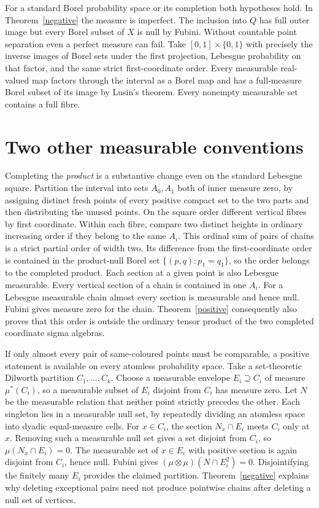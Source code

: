 \documentclass[11pt]{article}
\begin{document}
For a standard Borel probability space or its completion both hypotheses hold. In Theorem~\ref{negative} the measure is imperfect. The inclusion into $Q$ has full outer image but every Borel subset of $X$ is null by Fubini. Without countable point separation even a perfect measure can fail. Take $[0,1]\times\{0,1\}$ with precisely the inverse images of Borel sets under the first projection, Lebesgue probability on that factor, and the same strict first-coordinate order. Every measurable real-valued map factors through the interval as a Borel map and has a full-measure Borel subset of its image by Lusin's theorem. Every nonempty measurable set contains a full fibre.

\section{Two other measurable conventions}
Completing the \emph{product} is a substantive change even on the standard Lebesgue square. Partition the interval into sets $A_0,A_1$ both of inner measure zero, by assigning distinct fresh points of every positive compact set to the two parts and then distributing the unused points. On the square order different vertical fibres by first coordinate. Within each fibre, compare two distinct heights in ordinary increasing order if they belong to the same $A_i$. This ordinal sum of pairs of chains is a strict partial order of width two. Its difference from the first-coordinate order is contained in the product-null Borel set $\{(p,q):p_1=q_1\}$, so the order belongs to the completed product. Each section at a given point is also Lebesgue measurable. Every vertical section of a chain is contained in one $A_i$. For a Lebesgue measurable chain almost every section is measurable and hence null. Fubini gives measure zero for the chain. Theorem~\ref{positive} consequently also proves that this order is outside the ordinary tensor product of the two completed coordinate sigma algebras.

If only almost every pair of same-coloured points must be comparable, a positive statement is available on every atomless probability space. Take a set-theoretic Dilworth partition $C_1,\ldots,C_k$. Choose a measurable envelope $E_i\supseteq C_i$ of measure $\mu^*(C_i)$, so a measurable subset of $E_i$ disjoint from $C_i$ has measure zero. Let $N$ be the measurable relation that neither point strictly precedes the other. Each singleton lies in a measurable null set, by repeatedly dividing an atomless space into dyadic equal-measure cells. For $x\in C_i$, the section $N_x\cap E_i$ meets $C_i$ only at $x$. Removing such a measurable null set gives a set disjoint from $C_i$, so $\mu(N_x\cap E_i)=0$. The measurable set of $x\in E_i$ with positive section is again disjoint from $C_i$, hence null. Fubini gives $(\mu\otimes\mu)(N\cap E_i^2)=0$. Disjointifying the finitely many $E_i$ provides the claimed partition. Theorem~\ref{negative} explains why deleting exceptional pairs need not produce pointwise chains after deleting a null set of vertices.
\end{document}
